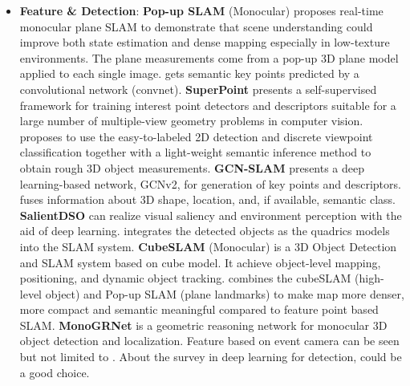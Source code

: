 \documentclass[journal,transmag]{IEEEtran}
\begin{document}
\begin{itemize}
    \item \textbf{Feature \& Detection}: \textbf{Pop-up SLAM} (Monocular) \cite{yang2016pop} proposes real-time monocular plane SLAM to demonstrate that scene understanding could improve both state estimation and dense mapping especially in low-texture environments. The plane measurements come from a pop-up 3D plane model applied to each single image. \cite{pavlakos20176} gets semantic key points predicted by a convolutional network (convnet). \textbf{SuperPoint} \cite{detone2018superpoint} presents a self-supervised framework for training interest point detectors and descriptors suitable for a large number of multiple-view geometry problems in computer vision. \cite{Li2018Stereo} proposes to use the easy-to-labeled 2D detection and discrete viewpoint classification together with a light-weight semantic inference method to obtain rough 3D object measurements. \textbf{GCN-SLAM} \cite{tang2019gcnv2} presents a deep learning-based network, GCNv2, for generation of key points and descriptors. \cite{grinvald2019volumetric} fuses information about 3D shape, location, and, if available, semantic class. \textbf{SalientDSO} \cite{liang2019salientdso} can realize visual saliency and environment perception with the aid of deep learning.  \cite{hosseinzadeh2018structure} integrates the detected objects as the quadrics models into the SLAM system. \textbf{CubeSLAM} (Monocular) is a 3D Object Detection and SLAM system \cite{yang2019cubeslam} based on cube model. It achieve object-level mapping, positioning, and dynamic object tracking. \cite{yang2019monocular} combines the cubeSLAM (high-level object) and Pop-up SLAM (plane landmarks) to make map more denser, more compact and semantic meaningful compared to feature point based SLAM.  \textbf{MonoGRNet} \cite{qin2019monogrnet}  is a geometric reasoning network for monocular 3D object detection and localization. Feature based on event camera can be seen but not limited to \cite{Lagorce2013Event}\cite{mueggler2017fast}. About the survey in deep learning for detection, \cite{wu2019recent} could be a good choice. 

\end{itemize}
\end{document}
